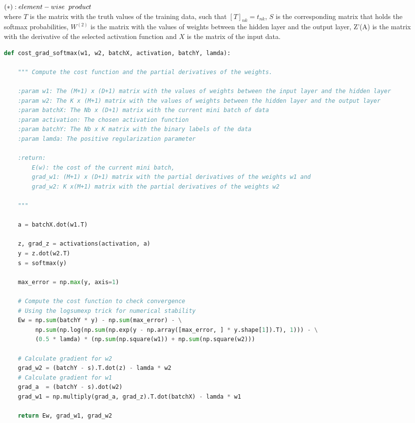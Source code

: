 \documentclass[11pt]{article}
\begin{document}
\noindent $(*) : element-wise\hspace{2mm} product $  \\

\noindent where $T$ is the matrix with the truth values of the training data, such that $[T]_{nk} = t_{nk}$, $S$ is the corresponding matrix that holds the softmax probabilities, $W^{(2)}$ is the matrix with the values of weights between the hidden layer and the output layer, Z'(A) is the matrix with the derivative of the selected activation function and $X$ is the matrix of the input data.
\newpage

\begin{lstlisting}[language = Python]
def cost_grad_softmax(w1, w2, batchX, activation, batchY, lamda):
    
    """ Compute the cost function and the partial derivatives of the weights.
    
    :param w1: The (M+1) x (D+1) matrix with the values of weights between the input layer and the hidden layer
    :param w2: The K x (M+1) matrix with the values of weights between the hidden layer and the output layer
    :param batchX: The Nb x (D+1) matrix with the current mini batch of data
    :param activation: The chosen activation function
    :param batchY: The Nb x K matrix with the binary labels of the data
    :param lamda: The positive regularization parameter
    
    :return:
        E(w): the cost of the current mini batch,
        grad_w1: (M+1) x (D+1) matrix with the partial derivatives of the weights w1 and
        grad_w2: K x(M+1) matrix with the partial derivatives of the weights w2
        
    """   
        
    a = batchX.dot(w1.T)

    z, grad_z = activations(activation, a)
    y = z.dot(w2.T)
    s = softmax(y)

    max_error = np.max(y, axis=1)
    
    # Compute the cost function to check convergence
    # Using the logsumexp trick for numerical stability 
    Ew = np.sum(batchY * y) - np.sum(max_error) - \
         np.sum(np.log(np.sum(np.exp(y - np.array([max_error, ] * y.shape[1]).T), 1))) - \
         (0.5 * lamda) * (np.sum(np.square(w1)) + np.sum(np.square(w2)))

    # Calculate gradient for w2
    grad_w2 = (batchY - s).T.dot(z) - lamda * w2
    # Calculate gradient for w1
    grad_a  = (batchY - s).dot(w2)
    grad_w1 = np.multiply(grad_a, grad_z).T.dot(batchX) - lamda * w1
    
    return Ew, grad_w1, grad_w2
\end{lstlisting}
\end{document}
